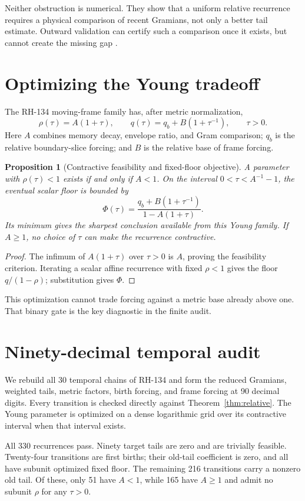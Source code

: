 \documentclass[12pt]{article}
\newtheorem{proposition}[theorem]{Proposition}
\begin{document}
Neither obstruction is numerical.  They show that a uniform relative
recurrence requires a physical comparison of recent Gramians, not only a
better tail estimate.  Outward validation can certify such a comparison once
it exists, but cannot create the missing gap \citep{Kato1995,Higham2002}.

\section{Optimizing the Young tradeoff}
The RH-134 moving-frame family has, after metric normalization,
\[
 \rho(\tau)=A(1+\tau),
 \qquad
 q(\tau)=q_b+B(1+\tau^{-1}),
 \qquad \tau>0.
\]
Here $A$ combines memory decay, envelope ratio, and Gram comparison;
$q_b$ is the relative boundary-slice forcing; and $B$ is the relative base
of frame forcing.

\begin{proposition}[Contractive feasibility and fixed-floor objective]\label{prop:opt}
A parameter with $\rho(\tau)<1$ exists if and only if $A<1$.  On the
interval $0<\tau<A^{-1}-1$, the eventual scalar floor is bounded by
\[
 \Phi(\tau)=\frac{q_b+B(1+\tau^{-1})}{1-A(1+\tau)}.
\]
Its minimum gives the sharpest conclusion available from this Young family.
If $A\geq1$, no choice of $\tau$ can make the recurrence contractive.
\end{proposition}
\begin{proof}
The infimum of $A(1+\tau)$ over $\tau>0$ is $A$, proving the feasibility
criterion.  Iterating a scalar affine recurrence with fixed
$\rho<1$ gives the floor $q/(1-\rho)$; substitution gives $\Phi$.
\end{proof}

This optimization cannot trade forcing against a metric base already above
one.  That binary gate is the key diagnostic in the finite audit.

\section{Ninety-decimal temporal audit}
We rebuild all 30 temporal chains of RH-134 and form the reduced Gramians,
weighted tails, metric factors, birth forcing, and frame forcing at 90
decimal digits.  Every transition is checked directly against
Theorem~\ref{thm:relative}.  The Young parameter is optimized on a dense
logarithmic grid over its contractive interval when that interval exists.

All 330 recurrences pass.  Ninety target tails are zero and are trivially
feasible.  Twenty-four transitions are first births; their old-tail
coefficient is zero, and all have subunit optimized fixed floor.  The
remaining 216 transitions carry a nonzero old tail.  Of these, only 51 have
$A<1$, while 165 have $A\geq1$ and admit no subunit $\rho$ for any
$\tau>0$.
\end{document}
